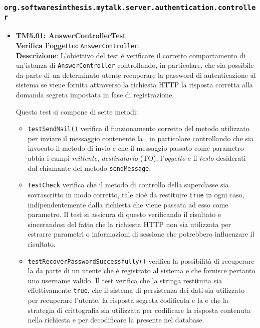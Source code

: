 \subsubsection{\texttt{org.softwaresinthesis.mytalk.server.authentication.controller}}
\begin{itemize}

\item \textbf{TM5.01: AnswerControllerTest}\\
\textbf{Verifica l'oggetto:} \texttt{AnswerController}.\\
\textbf{Descrizione}: L'obiettivo del test è verificare il corretto comportamento di un'istanza di \texttt{AnswerController} controllando, in particolare, che sia possibile da parte di un determinato utente recuperare la password di autenticazione al sistema se viene fornita attraverso la richiesta HTTP la risposta corretta alla domanda segreta impostata in fase di registrazione.

Questo test si compone di sette metodi:
\begin{itemize}

\item \texttt{testSendMail()} verifica il funzionamento corretto del metodo utilizzato per inviare il messaggio contenente la , in particolare controllando che sia invocato il metodo di invio e che il messaggio passato come parametro abbia i campi \textit{mittente}, \textit{destinatario} (TO), l'\textit{oggetto} e il \textit{testo} desiderati dal chiamante del metodo \texttt{sendMessage}.

\item \texttt{testCheck} verifica che il metodo di controllo della superclasse sia sovrascritto in modo corretto, tale cioè da restituire \texttt{true} in ogni caso, indipendentemente dalla richiesta che viene passata ad esso come parametro. Il test si assicura di questo verificando il risultato e sincerandosi del fatto che la richiesta HTTP non sia utilizzata per estrarre parametri o informazioni di sessione che potrebbero influenzare il risultato.

\item \texttt{testRecoverPasswordSuccessfully()} verifica la possibilità di recuperare la  da parte di un utente che è registrato al sistema e che fornisce pertanto uno username valido. Il test verifica che la stringa restituita sia effettivamente \texttt{true}, che il sistema di persistenza dei dati sia utilizzato per recuperare l'utente, la risposta segreta codificata e la  e che la strategia di crittografia sia utilizzata per codificare la risposta contenuta nella richiesta e per decodificare la  presente nel database.


\end{itemize}
\end{itemize}
